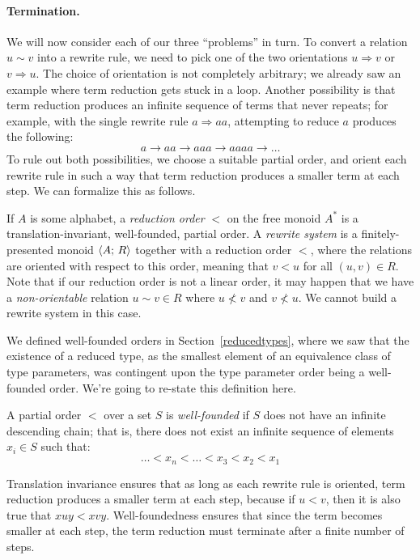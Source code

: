 \documentclass[../generics]{subfiles}
\begin{document}
\paragraph{Termination.}  We will now consider each of our three ``problems'' in turn. To convert a relation $u\sim v$ into a rewrite rule, we need to pick one of the two orientations $u\Rightarrow v$ or $v\Rightarrow u$. The choice of orientation is not completely arbitrary; we already saw an example where term reduction gets stuck in a loop. Another possibility is that term reduction produces an infinite sequence of terms that never repeats; for example, with the single rewrite rule $a\Rightarrow aa$, attempting to reduce $a$ produces the following:
\[a\rightarrow aa\rightarrow aaa\rightarrow aaaa\rightarrow\ldots\]
To rule out both possibilities, we choose a suitable partial order, and orient each rewrite rule in such a way that term reduction produces a smaller term at each step. We can formalize this as follows.
\begin{definition}\label{reduction order def}
If $A$ is some alphabet, a \emph{reduction order} $<$ on the free monoid $A^*$ is a translation-invariant, well-founded, partial order. A \emph{rewrite system} is a finitely-presented monoid $\langle A;\,R\rangle$ together with a reduction order $<$, where the relations are oriented with respect to this order, meaning that $v<u$ for all $(u,v)\in R$. Note that if our reduction order is not a linear order, it may happen that we have a \emph{non-orientable} relation $u\sim v\in R$ where $u\not< v$ and $v\not< u$. We cannot build a rewrite system in this case.
\end{definition}
We defined well-founded orders in Section~\ref{reducedtypes}, where we saw that the existence of a reduced type, as the smallest element of an equivalence class of type parameters, was contingent upon the type parameter order being a well-founded order. We're going to re-state this definition here.
\begin{definition}
A partial order $<$ over a set $S$ is \emph{well-founded} if $S$ does not have an infinite descending chain; that is, there does not exist an infinite sequence of elements $x_i\in S$ such that:
\[\ldots <x_n<\ldots <x_3<x_2<x_1\]
\end{definition}
Translation invariance ensures that as long as each rewrite rule is oriented, term reduction produces a smaller term at each step, because if $u<v$, then it is also true that $xuy<xvy$. Well-foundedness ensures that since the term becomes smaller at each step, the term reduction must terminate after a finite number of steps.
\end{document}
